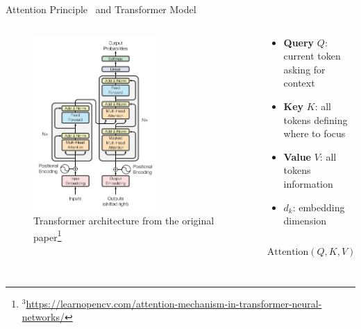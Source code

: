 \documentclass[11pt,aspectratio=169]{beamer}
\begin{document}
\begin{frame}{Attention Principle~\cite{Bahdanau2014NeuralMT} and Transformer Model~\cite{DBLP:journals/corr/VaswaniSPUJGKP17}}
    \begin{columns}
        \renewcommand{\thempfootnote}{\arabic{footnote}}
        \begin{column}{0.45\linewidth}
            \vspace{-0.3cm}
            \begin{figure}
                \centering
                \includegraphics[width=0.65\textwidth]{transformer.png}
                \caption{\centering Transformer architecture from the original paper\footnote{\tiny$^3$\url{https://learnopencv.com/attention-mechanism-in-transformer-neural-networks/}}}
            \end{figure}            
        \end{column}
        \begin{column}{0.55\linewidth}
            \vspace{-0.7cm}
            \begin{itemize}
                \item \textbf{Query} $Q$: current token asking for context
                \item \textbf{Key} $K$: all tokens defining where to focus
                \item \textbf{Value} $V$: all tokens information
                \item $d_k$: embedding dimension
            \end{itemize}
            \vspace{0.3cm}
            \begin{equation*}
                \text{Attention}(Q, K, V) = \text{softmax}\left(\frac{QK^\top}{\sqrt{d_k}}\right)V
            \end{equation*}
        \end{column}
    \end{columns}
\end{frame}
\end{document}
